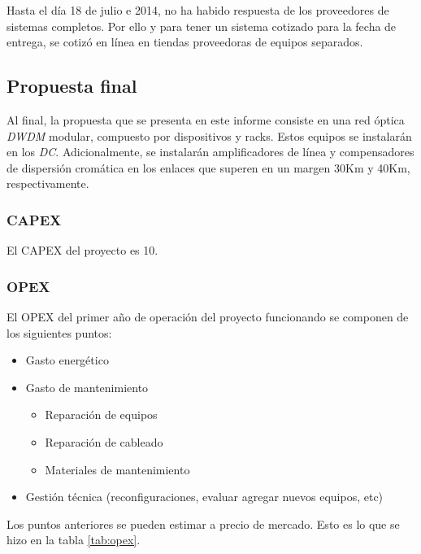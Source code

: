 
Hasta el día 18 de julio e 2014, no ha habido respuesta de los
proveedores de sistemas completos. Por ello y para tener un sistema
cotizado para la fecha de entrega, se cotizó en línea en tiendas
proveedoras de equipos separados.

\subsection{Propuesta final}
\label{sec:ppfinal}

Al final, la propuesta que se presenta en este informe consiste en una
red óptica \emph{DWDM} modular, compuesto por dispositivos y
racks. Estos equipos se instalarán en los \emph{DC}. Adicionalmente,
se instalarán amplificadores de línea y compensadores de dispersión
cromática en los enlaces que superen en un margen 30Km y 40Km,
respectivamente.

\subsubsection{CAPEX}
\label{sec:capex}

El CAPEX del proyecto es 10.

\subsubsection{OPEX}
\label{sec:opex}

El OPEX del primer año de operación del proyecto funcionando se
componen de los siguientes puntos:
\begin{itemize}
\item Gasto energético
\item Gasto de mantenimiento
  \begin{itemize}
  \item Reparación de equipos
  \item Reparación de cableado
  \item Materiales de mantenimiento
  \end{itemize}
\item Gestión técnica (reconfiguraciones, evaluar agregar nuevos
  equipos, etc)
\end{itemize}

Los puntos anteriores se pueden estimar a precio de mercado. Esto es
lo que se hizo en la tabla \ref{tab:opex}.

